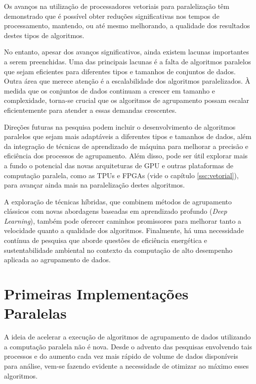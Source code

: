 \documentclass[12pt,
openright, 
oneside, %
a4paper,    %
brazil]{facom-ufu-abntex2}
\begin{document}
Os avanços na utilização de processadores vetoriais para paralelização têm demonstrado que é possível obter reduções significativas nos tempos de processamento, mantendo, ou até mesmo melhorando, a qualidade dos resultados destes tipos de algoritmos.

No entanto, apesar dos avanços significativos, ainda existem lacunas importantes a serem preenchidas. Uma das principais lacunas é a falta de algoritmos paralelos que sejam eficientes para diferentes tipos e tamanhos de conjuntos de dados. Outra área que merece atenção é a escalabilidade dos algoritmos paralelizados. À medida que os conjuntos de dados continuam a crescer em tamanho e complexidade, torna-se crucial que os algoritmos de agrupamento possam escalar eficientemente para atender a essas demandas crescentes.


Direções futuras na pesquisa podem incluir o desenvolvimento de algoritmos paralelos que sejam mais adaptáveis a diferentes tipos e tamanhos de dados, além da integração de técnicas de aprendizado de máquina para melhorar a precisão e eficiência dos processos de agrupamento. Além disso, pode ser útil explorar mais a fundo o potencial das novas arquiteturas de GPU e outras plataformas de computação paralela, como as TPUs e FPGAs (vide o capítulo \ref{ssc:vetorial}), para avançar ainda mais na paralelização destes algoritmos.

A exploração de técnicas híbridas, que combinem métodos de agrupamento clássicos com novas abordagens baseadas em aprendizado profundo (\textit{Deep Learning}), também pode oferecer caminhos promissores para melhorar tanto a velocidade quanto a qualidade dos algoritmos. Finalmente, há uma necessidade contínua de pesquisa que aborde questões de eficiência energética e sustentabilidade ambiental no contexto da computação de alto desempenho aplicada ao agrupamento de dados.




\section{Primeiras Implementações Paralelas}

A ideia de acelerar a execução de algoritmos de agrupamento de dados utilizando a computação paralela não é nova. Desde o advento das pesquisas envolvendo tais processos e do aumento cada vez mais rápido de volume de dados disponíveis para análise, vem-se fazendo evidente a necessidade de otimizar ao máximo esses algoritmos.
\end{document}
